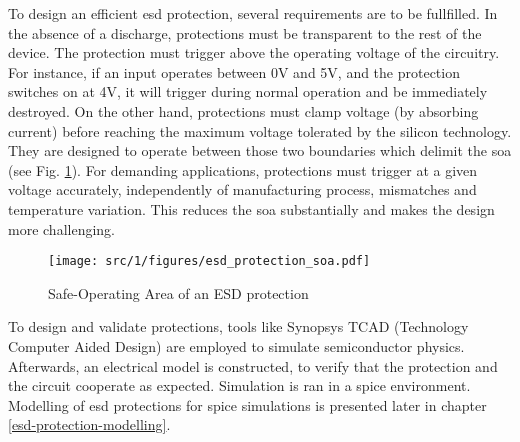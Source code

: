 To design an efficient \gls{esd} protection, several requirements are to be fullfilled.
In the absence of a discharge, protections must be transparent to the rest of the device.
The protection must trigger above the operating voltage of the circuitry.
For instance, if an input operates between 0V and 5V, and the protection switches on at 4V, it will trigger during normal operation and be immediately destroyed.
On the other hand, protections must clamp voltage (by absorbing current) before reaching the maximum voltage tolerated by the silicon technology.
They are designed to operate between those two boundaries which delimit the \gls{soa} (see Fig. \ref{fig:soa-esd-protection}).
For demanding applications, protections must trigger at a given voltage accurately, independently of manufacturing process, mismatches and temperature variation.
This reduces the \gls{soa} substantially and makes the design more challenging.

\begin{figure}[!h]
  \centering
  \texttt{[image: src/1/figures/esd\_protection\_soa.pdf]}
  \caption{Safe-Operating Area of an ESD protection}
  \label{fig:soa-esd-protection}
\end{figure}

To design and validate protections, tools like Synopsys TCAD (Technology Computer Aided Design) \cite{tcad} are employed to simulate semiconductor physics.
Afterwards, an electrical model is constructed, to verify that the protection and the circuit cooperate as expected.
Simulation is ran in a \gls{spice} environment.
Modelling of \gls{esd} protections for \gls{spice} simulations is presented later in chapter \ref{esd-protection-modelling}.
